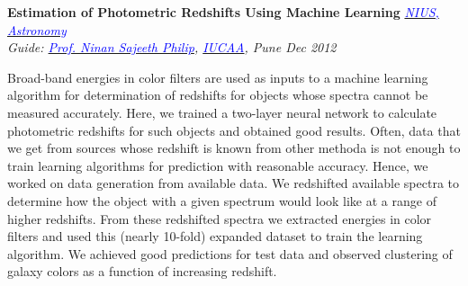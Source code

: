 \documentclass[margin,line]{res}
\newenvironment{list1}{
  \begin{list}{\ding{113}}{%
      \setlength{\itemsep}{0in}
      \setlength{\parsep}{0in} \setlength{\parskip}{0in}
      \setlength{\topsep}{0in} \setlength{\partopsep}{0in} 
      \setlength{\leftmargin}{0.17in}}}{\end{list}}
\begin{document}
\begin{resume}
{\bf Estimation of Photometric Redshifts Using Machine Learning} \hfill \textit{\href{http://nius.hbcse.tifr.res.in/}{\textcolor{blue} {NIUS, Astronomy}}} \\
{\em Guide: \href{http://www.iucaa.ernet.in/~nspp/}{\textcolor{blue}{Prof. Ninan Sajeeth Philip}}, \href{http://www.iucaa.ernet.in/}{\textcolor{blue} {IUCAA}}, Pune \hfill Dec 2012} \\
\vspace*{-.15in}
\begin{list1}
\item[] Broad-band energies in color filters are used as inputs to a machine learning algorithm for determination of redshifts for objects whose spectra cannot be measured accurately. Here, we trained a two-layer neural network to calculate photometric redshifts for such objects and obtained good results. Often, data that we get from sources whose redshift is known from other methoda is not enough to train learning algorithms for prediction with reasonable accuracy. Hence, we worked on data generation from available data. We redshifted available spectra to determine how the object with a given spectrum would look like at a range of higher redshifts. From these redshifted spectra we extracted energies in color filters and used this (nearly 10-fold) expanded dataset to train the learning algorithm. We achieved good predictions for test data and observed clustering of galaxy colors as a function of increasing redshift.
\end{list1}


\end{resume}
\end{document}
